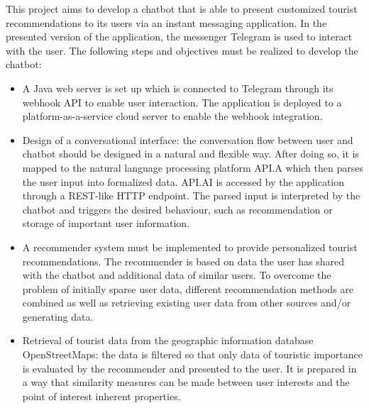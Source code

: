 
This project aims to develop a chatbot that is able to present customized tourist recommendations to its users via an instant messaging application. In the presented version of the application, the messenger Telegram is used to interact with the user. 
The following steps and objectives must be realized to develop the chatbot:
\begin{itemize}
\item A Java web server is set up which is connected to Telegram through its webhook API to enable user interaction. The application is deployed to a platform-as-a-service cloud server to enable the webhook integration.
 
\item Design of a conversational interface: the conversation flow between user and chatbot should be designed in a natural and flexible way. After doing so, it is mapped to the natural language processing platform API.A which then parses the user input into formalized data. API.AI is accessed by the application through a REST-like HTTP endpoint. The parsed input is interpreted by the chatbot and triggers the desired behaviour, such as recommendation or storage of important user information.  

\item A recommender system must be implemented to provide personalized tourist recommendations. The recommender is based on data the user has shared with the chatbot and additional data of similar users. To overcome the problem of initially sparse user data, different recommendation methods are combined as well as retrieving existing user data from other sources and/or generating data.

\item Retrieval of tourist data from the geographic information database OpenStreetMaps: the data is filtered so that only data of touristic importance is evaluated by the recommender and presented to the user. It is prepared in a way that similarity measures can be made between user interests and the point of interest inherent properties.
\end{itemize}
